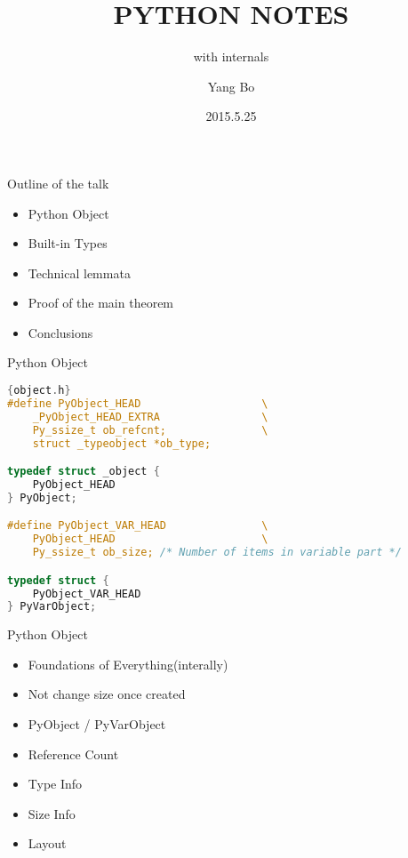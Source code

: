 \documentclass[xcolor=svgnames]{beamer}
\title{PYTHON NOTES}
\subtitle{with internals}
\author{Yang Bo}
\institute[Admaster]{
    RDBJ \\
    Admaster
}
\date{2015.5.25}
\begin{document}
\begin{frame}[plain]
  \titlepage
\end{frame}
\begin{frame}{Outline of the talk} 
 
\begin{itemize} 
  \item Python Object
  \item Built-in Types 
  \item Technical lemmata 
  \item Proof of the main theorem 
  \item Conclusions 
\end{itemize} 
 
\end{frame} 

\begin{frame}[fragile]{Python Object}
    \begin{lstlisting}[language=C]{object.h}
#define PyObject_HEAD                   \
    _PyObject_HEAD_EXTRA                \
    Py_ssize_t ob_refcnt;               \
    struct _typeobject *ob_type;

typedef struct _object {
    PyObject_HEAD
} PyObject;

#define PyObject_VAR_HEAD               \
    PyObject_HEAD                       \
    Py_ssize_t ob_size; /* Number of items in variable part */

typedef struct {
    PyObject_VAR_HEAD
} PyVarObject;
\end{lstlisting} 
\end{frame}

\begin{frame}{Python Object}
  \begin{itemize}
    \item Foundations of Everything(interally)
    \item Not change size once created
    \item PyObject / PyVarObject
    \item Reference Count
    \item Type Info
    \item Size Info
    \item Layout
  \end{itemize}
\end{frame}
\end{document}

